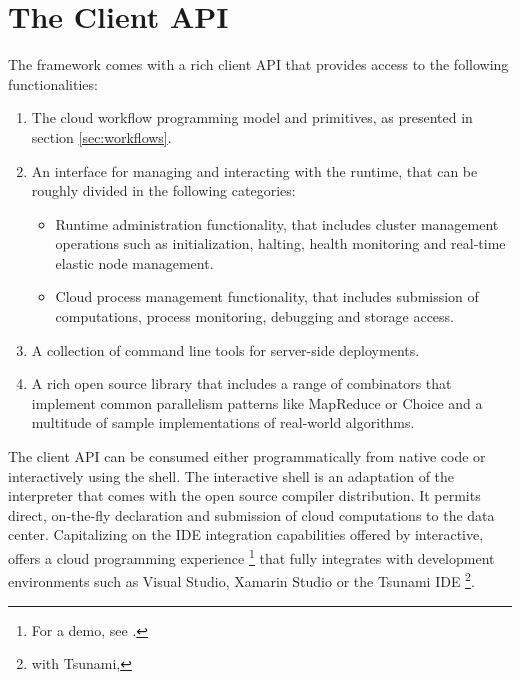 %
%

\section{The \TitularMbrace{} Client API}
\label{sec:client}

The \mbrace{} framework comes with a rich client API that provides access to the 
following functionalities:
\begin{enumerate}
\item The cloud workflow programming model and primitives, as presented in section
\ref{sec:workflows}.
\item An interface for managing and interacting with the \mbrace{} runtime, 
that can be roughly divided in the following categories:
	\begin{itemize}
		\item Runtime administration functionality, that includes cluster management
		operations such as initialization, halting, health monitoring and
		real-time elastic node management.
		\item Cloud process management functionality, that includes submission of
		computations, process monitoring, debugging and storage access.
	\end{itemize}

\item A collection of command line tools for server-side deployments.
\item A rich open source library that includes a range of combinators that
implement common parallelism patterns like MapReduce or Choice and a multitude of 
sample implementations of real-world algorithms.
\end{enumerate}
%
The client API can be consumed either programmatically from native \dotnet{} code
or interactively using the \mbox{\mbrace{}} shell. The \mbrace{} interactive shell is
an adaptation of the interpreter that comes with the open source \fsharp{} compiler
distribution. It permits direct, on-the-fly declaration and submission of cloud 
computations to the data center. Capitalizing on the IDE integration capabilities 
offered by \fsharp{} interactive, \mbrace{} offers a cloud programming experience%
\footnote{For a demo, see .}
that fully integrates with development environments such as Visual Studio,
Xamarin Studio or the Tsunami IDE%
\footnote{\mbrace{} with Tsunami, }.

